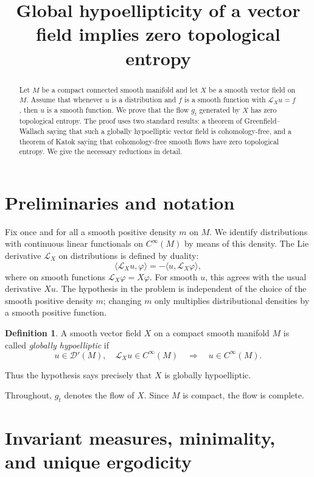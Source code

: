 \documentclass[11pt]{article}
\title{Global hypoellipticity of a vector field implies zero topological entropy}
\author{}
\date{}
\theoremstyle{definition}
\newtheorem{definition}[theorem]{Definition}
\begin{document}
\maketitle

\begin{abstract}
Let \(M\) be a compact connected smooth manifold and let \(X\) be a smooth vector field on \(M\). Assume that whenever \(u\) is a distribution and \(f\) is a smooth function with \(\mathcal L_X u=f\), then \(u\) is a smooth function. We prove that the flow \(g_t\) generated by \(X\) has zero topological entropy. The proof uses two standard results: a theorem of Greenfield--Wallach saying that such a globally hypoelliptic vector field is cohomology-free, and a theorem of Katok saying that cohomology-free smooth flows have zero topological entropy. We give the necessary reductions in detail.
\end{abstract}

\section{Preliminaries and notation}

Fix once and for all a smooth positive density \(m\) on \(M\). We identify distributions with continuous linear functionals on \(C^\infty(M)\) by means of this density. The Lie derivative \(\mathcal L_X\) on distributions is defined by duality:
\[
\langle \mathcal L_X u,\varphi\rangle
=
-\langle u,\mathcal L_X\varphi\rangle ,
\]
where on smooth functions \(\mathcal L_X\varphi=X\varphi\). For smooth \(u\), this agrees with the usual derivative \(Xu\). The hypothesis in the problem is independent of the choice of the smooth positive density \(m\); changing \(m\) only multiplies distributional densities by a smooth positive function.

\begin{definition}
A smooth vector field \(X\) on a compact smooth manifold \(M\) is called \emph{globally hypoelliptic} if
\[
u\in\mathcal D'(M),\quad \mathcal L_X u\in C^\infty(M)
\quad\Longrightarrow\quad
u\in C^\infty(M).
\]
\end{definition}

Thus the hypothesis says precisely that \(X\) is globally hypoelliptic.

Throughout, \(g_t\) denotes the flow of \(X\). Since \(M\) is compact, the flow is complete.

\section{Invariant measures, minimality, and unique ergodicity}
\end{document}
